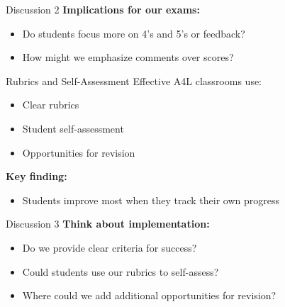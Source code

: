 \documentclass[dvipsnames]{beamer}
\begin{document}

\begin{frame}{Discussion 2}
\textbf{Implications for our exams:}
\begin{itemize}
\item Do students focus more on 4's and 5's or feedback?
\item How might we emphasize comments over scores?
\end{itemize}
\end{frame}


\begin{frame}{Rubrics and Self-Assessment}
Effective A4L classrooms use:
\begin{itemize}
\item Clear rubrics
\item Student self-assessment
\item Opportunities for revision
\end{itemize}

\vspace{1em}

\textbf{Key finding:}
\begin{itemize}
\item Students improve most when they track their own progress
\end{itemize}
\end{frame}


\begin{frame}{Discussion 3}
\textbf{Think about implementation:}
\begin{itemize}
\item Do we provide clear criteria for success?
\item Could students use our rubrics to self-assess?
\item Where could we add additional opportunities for revision?
\end{itemize}
\end{frame}
\end{document}
